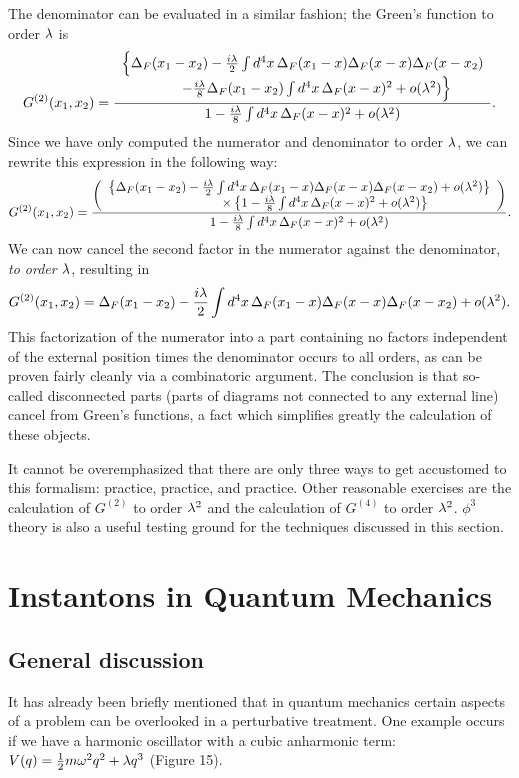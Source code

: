 \documentclass[12pt]{article}
\begin{document}
The denominator can be evaluated in a similar fashion; the Green's
function to order $\lambda$ is
\[
G^{(2)}(x_1,x_2)={
\begin{array}{c}
\Big\{\Delta_F(x_1-x_2)
-{i\lambda\over2}\int d^4x\,\Delta_F(x_1-x)\Delta_F(x-x)\Delta_F(x-x_2)\\
\qquad-{i\lambda\over8}\Delta_F(x_1-x_2)\int d^4x\,\Delta_F(x-x)^2
+o(\lambda^2)\Big\}
\end{array}
\over
1-{i\lambda\over8}\int d^4x\,\Delta_F(x-x)^2+o(\lambda^2)
}.
\]
Since we have only computed the numerator and denominator to order
$\lambda$, we can rewrite this expression in the following way:
\[
G^{(2)}(x_1,x_2)={
\left(\begin{array}{c}
\left\{\Delta_F(x_1-x_2)
-{i\lambda\over2}\int d^4x\,\Delta_F(x_1-x)\Delta_F(x-x)\Delta_F(x-x_2)
+o(\lambda^2)\right\}\\
\qquad\qquad
\times\left\{1-{i\lambda\over8}\int d^4x\,\Delta_F(x-x)^2+o(\lambda^2)\right\}
\end{array}\right)
\over
1-{i\lambda\over8}\int d^4x\,\Delta_F(x-x)^2+o(\lambda^2)
}.
\]
We can now cancel the second factor in the numerator against
the denominator, {\em to order $\lambda$}, resulting in
\[
G^{(2)}(x_1,x_2)=\Delta_F(x_1-x_2)
-{i\lambda\over2}\int d^4x\,\Delta_F(x_1-x)\Delta_F(x-x)\Delta_F(x-x_2)
+o(\lambda^2).
\]
This factorization of the numerator into a part containing no factors
independent of the external position times the denominator occurs to
all orders, as can be proven fairly cleanly via a combinatoric
argument. The conclusion is that so-called disconnected parts (parts
of diagrams not connected to any external line) cancel
from Green's functions, a fact which simplifies greatly the
calculation of these objects.

It cannot be overemphasized
that there are only three ways to get accustomed to this formalism:
practice, practice,
and practice. Other reasonable exercises are the calculation of
$G^{(2)}$ to order $\lambda^2$ and the calculation of $G^{(4)}$ to order
$\lambda^2$. $\phi^3$ theory is also a useful testing ground for the
techniques discussed in this section.



\section[Instantons]
{Instantons in Quantum Mechanics}

\subsection{General discussion}
It has already been briefly mentioned that in quantum mechanics 
certain aspects of a problem can be overlooked in a perturbative
treatment. One example occurs if we have a harmonic oscillator with a
cubic anharmonic term: $V(q)={\frac 12} m{\omega}^2 q^2+\lambda q^3$ (Figure 15).
\end{document}
